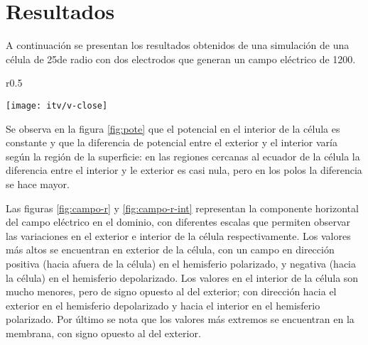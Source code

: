 
\newpage

\section{Resultados}
A continuación se presentan los resultados obtenidos de una simulación de una célula de 25\um de radio con dos electrodos que generan un campo eléctrico de 1200\vcm.\\



\begin{wrapfigure}{r}{0.5\textwidth}
  \begin{center}
    \texttt{[image: itv/v-close]}
  \end{center}
  \caption{Potencial eléctrico en el dominio}
  \label{fig:pote}
\end{wrapfigure}

Se observa en la figura \ref{fig:pote} que el potencial en el interior de la célula es constante y que la diferencia de potencial entre el exterior y el interior varía según la región de la superficie: en las regiones cercanas al ecuador de la célula la diferencia entre el interior y le exterior es casi nula, pero en los polos la diferencia se hace mayor. 

Las figuras \ref{fig:campo-r} y \ref{fig:campo-r-int} representan la componente horizontal del campo eléctrico en el dominio, con diferentes escalas que permiten observar las variaciones en el exterior e interior de la célula respectivamente. Los valores más altos se encuentran en exterior de la célula, con un campo en dirección positiva (hacia afuera de la célula) en el hemisferio polarizado, y negativa (hacia la célula) en el hemisferio depolarizado. Los valores en el interior de la célula son mucho menores, pero de signo opuesto al del exterior; con dirección hacia el exterior en el hemisferio depolarizado y hacia el interior en el hemisferio polarizado. Por último se nota que los valores más extremos se encuentran en la membrana, con signo opuesto al del exterior. 

